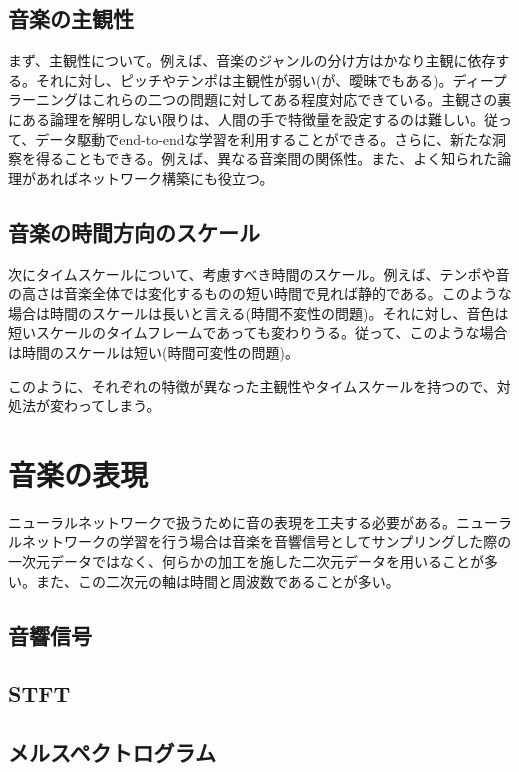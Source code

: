 \subsection{音楽の主観性}

まず、主観性について。例えば、音楽のジャンルの分け方はかなり主観に依存する。それに対し、ピッチやテンポは主観性が弱い(が、曖昧でもある)。ディープラーニングはこれらの二つの問題に対してある程度対応できている。主観さの裏にある論理を解明しない限りは、人間の手で特徴量を設定するのは難しい。従って、データ駆動でend-to-endな学習を利用することができる。さらに、新たな洞察を得ることもできる。例えば、異なる音楽間の関係性。また、よく知られた論理があればネットワーク構築にも役立つ。

\subsection{音楽の時間方向のスケール}

次にタイムスケールについて、考慮すべき時間のスケール。例えば、テンポや音の高さは音楽全体では変化するものの短い時間で見れば静的である。このような場合は時間のスケールは長いと言える(時間不変性の問題)。それに対し、音色は短いスケールのタイムフレームであっても変わりうる。従って、このような場合は時間のスケールは短い(時間可変性の問題)。

このように、それぞれの特徴が異なった主観性やタイムスケールを持つので、対処法が変わってしまう。

\section{音楽の表現}
\label{sec:preprocess}

ニューラルネットワークで扱うために音の表現を工夫する必要がある。ニューラルネットワークの学習を行う場合は音楽を音響信号としてサンプリングした際の一次元データではなく、何らかの加工を施した二次元データを用いることが多い。また、この二次元の軸は時間と周波数であることが多い。



\subsection{音響信号}

\subsection{STFT}

\subsection{メルスペクトログラム}

